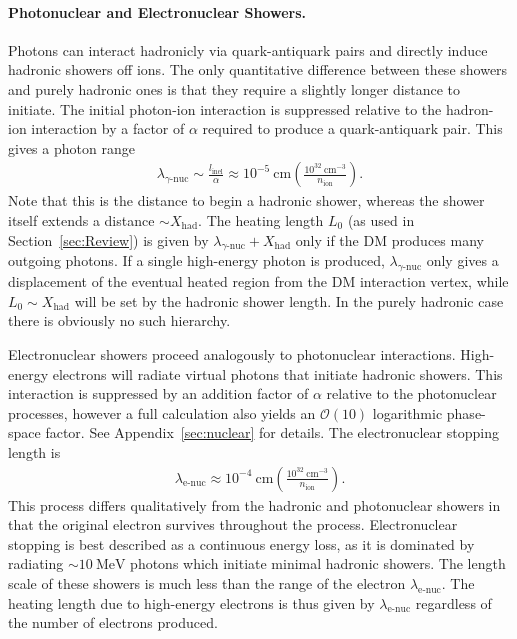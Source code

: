 \documentclass[twocolumn, preprintnumbers,amsmath,amssymb,prd, superscriptaddress]{revtex4}
\newcommand{\OO}{\mathcal{O}}
\newcommand{\MeV}{\text{MeV}}
\def\r{\right)}
\def\l{\left(}
\begin{document}
\paragraph{Photonuclear and Electronuclear Showers.}
Photons can interact hadronicly via quark-antiquark pairs and directly induce hadronic showers off ions.
The only quantitative difference between these showers and purely hadronic ones is that they require a slightly longer distance to initiate.
The initial photon-ion interaction is suppressed relative to the hadron-ion interaction by a factor of $\alpha$ required to produce a quark-antiquark pair.
This gives a photon range
\begin{align}
\label{eq:photonuclength}
  \lambda_{\gamma\text{-nuc}} \sim \frac{l_\text{inel}}{\alpha}
  \approx 10^{-5} ~\text{cm} \l\frac{10^{32}~\text{cm}^{-3}}{n_\text{ion}}\r.
\end{align}
Note that this is the distance to begin a hadronic shower, whereas the shower itself extends a distance $\sim X_\text{had}$.
The heating length $L_0$ (as used in Section~\ref{sec:Review}) is given by $\lambda_{\gamma\text{-nuc}} + X_\text{had}$ only if the DM produces many outgoing photons.
If a single high-energy photon is produced, $\lambda_{\gamma\text{-nuc}}$ only gives a displacement of the eventual heated region from the DM interaction vertex, while $L_0 \sim X_\text{had}$ will be set by the hadronic shower length.
In the purely hadronic case there is obviously no such hierarchy.

Electronuclear showers proceed analogously to photonuclear interactions.
High-energy electrons will radiate virtual photons that initiate hadronic showers.
This interaction is suppressed by an addition factor of $\alpha$ relative to the photonuclear processes, however a full calculation also yields an $\OO(10)$ logarithmic phase-space factor.
See Appendix~\ref{sec:nuclear} for details.
The electronuclear stopping length is
\begin{align}
\label{eq:electronuclength}
  \lambda_\text{e-nuc}
  \approx 10^{-4} ~\text{cm} \l\frac{10^{32}~\text{cm}^{-3}}{n_\text{ion}}\r.
\end{align}
This process differs qualitatively from the hadronic and photonuclear showers in that the original electron survives throughout the process.
Electronuclear stopping is best described as a continuous energy loss, as it is dominated by radiating $\sim 10~\MeV$ photons which initiate minimal hadronic showers.
The length scale of these showers is much less than the range of the electron $\lambda_\text{e-nuc}$.
The heating length due to high-energy electrons is thus given by $\lambda_\text{e-nuc}$ regardless of the number of electrons produced.
\end{document}
